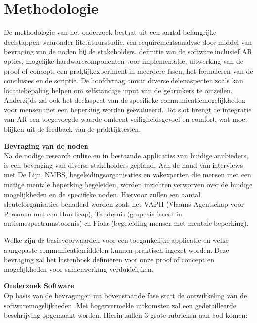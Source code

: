 \documentclass{hogent-article}
\begin{document}
    
    \section{Methodologie}%
   
    De methodologie van het onderzoek bestaat uit een aantal belangrijke deelstappen waaronder literatuurstudie, een requirementsanalyse door middel van bevraging van de noden bij de stakeholders, definitie van de software inclusief AR opties, mogelijke hardwarecomponenten voor implementatie, uitwerking van de proof of concept, een praktijkexperiment in meerdere fasen, het formuleren van de conclusies en de scriptie. De hoofdvraag omvat diverse delenaspecten zoals kan locatiebepaling helpen om zelfstandige input van de gebruikers te omzeilen. Anderzijds zal ook het deelaspect van de specifieke communicatiemogelijkheden voor mensen met een beperking worden geëvalueerd. Tot slot brengt de integratie van AR een toegevoegde waarde omtrent veiligheidsgevoel en comfort, wat moet blijken uit de feedback van de praktijktesten.
    
    \textbf{Bevraging van de noden} \\
    
    Na de nodige research online en in bestaande applicaties van huidige aanbieders, is een bevraging van diverse stakeholders gepland. Aan de hand van interviews met De Lijn, NMBS, begeleidingsorganisaties en vakexperten die mensen met een matige mentale beperking begeleiden, worden inzichten verworven over de huidige mogelijkheden en de specifieke noden. Hiervoor zullen een aantal sleutelorganisaties benaderd worden zoals het VAPH (Vlaams Agentschap voor Personen met een Handicap), Tanderuis (gespecialiseerd in autismespectrumstoornis) en Fiola (begeleiding mensen met mentale beperking).

    Welke zijn de basisvoorwaarden voor een toegankelijke applicatie en welke aangepaste communicatiemiddelen kunnen praktisch ingezet worden. Deze bevraging zal het lastenboek definiëren voor onze proof of concept en mogelijkheden voor samenwerking verduidelijken. 
    
    \textbf{Onderzoek Software} \\
    
    Op basis van de bevragingen uit bovenstaande fase start de ontwikkeling van de softwaremogelijkheden. Met hogervermelde uitkomsten zal een gedetailleerde beschrijving opgemaakt worden. Hierin zullen 3 grote rubrieken aan bod komen:
    
\end{document}
